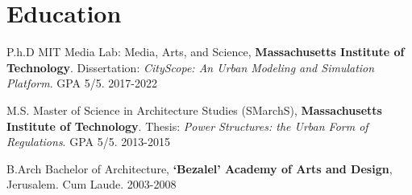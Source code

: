 \section*{Education}

\begin{tablist}

    \item[P.h.D] \tab MIT Media Lab: Media, Arts, and Science, \textbf{Massachusetts Institute of Technology}. Dissertation: \textit{CityScope: An Urban Modeling and Simulation Platform}. GPA 5/5. 2017-2022
    \item[M.S.] \tab Master of Science in Architecture Studies (SMarchS), \textbf{Massachusetts Institute of Technology}. Thesis: \textit{Power Structures: the Urban Form of Regulations}. GPA 5/5. 2013-2015
    \item[B.Arch]  \tab Bachelor of Architecture, \textbf{`Bezalel' Academy of Arts and Design}, Jerusalem. Cum Laude. 2003-2008

\end{tablist}
